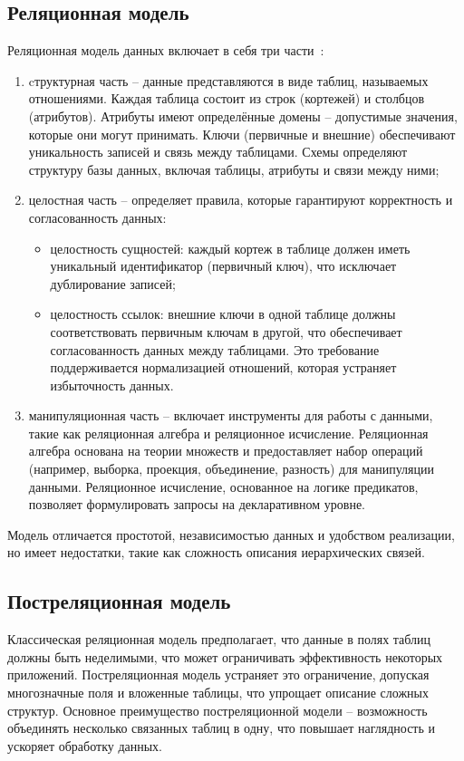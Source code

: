 \subsection{Реляционная модель}

Реляционная модель данных включает в себя три части~\cite{lit8}:
\begin{enumerate}
	\item cтруктурная часть -- данные представляются в виде таблиц, называемых отношениями. Каждая таблица состоит из строк (кортежей) и столбцов (атрибутов). Атрибуты имеют определённые домены -- допустимые значения, которые они могут принимать. Ключи (первичные и внешние) обеспечивают уникальность записей и связь между таблицами. Схемы определяют структуру базы данных, включая таблицы, атрибуты и связи между ними;
	\item целостная часть -- определяет правила, которые гарантируют корректность и согласованность данных:
	\begin{itemize}[label=--]
		\item целостность сущностей: каждый кортеж в таблице должен иметь уникальный идентификатор (первичный ключ), что исключает дублирование записей;
		\item целостность ссылок: внешние ключи в одной таблице должны соответствовать первичным ключам в другой, что обеспечивает согласованность данных между таблицами. Это требование поддерживается нормализацией отношений, которая устраняет избыточность данных.
	\end{itemize}
	\item манипуляционная часть -- включает инструменты для работы с данными, такие как реляционная алгебра и реляционное исчисление. Реляционная алгебра основана на теории множеств и предоставляет набор операций (например, выборка, проекция, объединение, разность) для манипуляции данными. Реляционное исчисление, основанное на логике предикатов, позволяет формулировать запросы на декларативном уровне.
\end{enumerate}

Модель отличается простотой, независимостью данных и удобством реализации, но имеет недостатки, такие как сложность описания иерархических связей.

\subsection{Постреляционная модель}

Классическая реляционная модель предполагает, что данные в полях таблиц должны быть неделимыми, что может ограничивать эффективность некоторых приложений. Постреляционная модель устраняет это ограничение, допуская многозначные поля и вложенные таблицы, что упрощает описание сложных структур. Основное преимущество постреляционной модели -- возможность объединять несколько связанных таблиц в одну, что повышает наглядность и ускоряет обработку данных.

